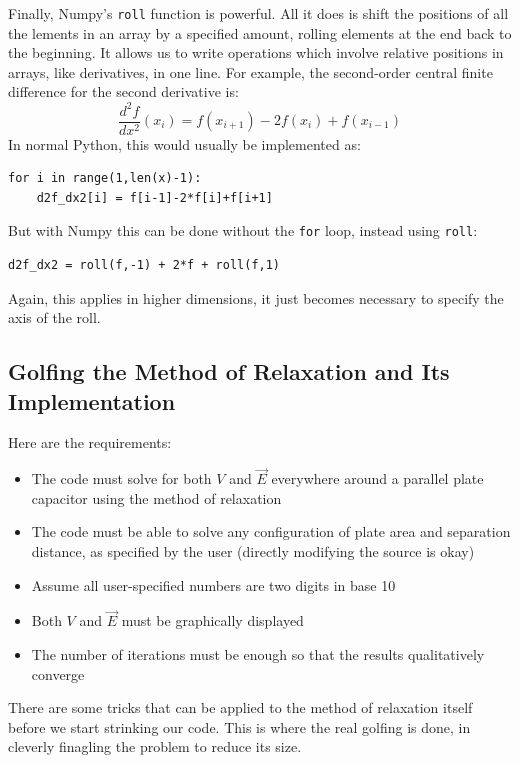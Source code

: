 \documentclass[12pt,twocolumn]{article}
\begin{document}
Finally, Numpy's \texttt{roll} function is powerful. All it does is shift the positions of all the lements in an array by a specified amount, rolling elements at the end back to the beginning. It allows us to write operations which involve relative positions in arrays, like derivatives, in one line. For example, the second-order central finite difference for the second derivative is:
\begin{equation}
\frac{d^2f}{dx^2}(x_i) = f(x_{i+1})-2 f(x_{i})+f(x_{i-1})
\end{equation}
In normal Python, this would usually be implemented as:
\begin{verbatim}
for i in range(1,len(x)-1):
    d2f_dx2[i] = f[i-1]-2*f[i]+f[i+1]
\end{verbatim}
But with Numpy this can be done without the \texttt{for} loop, instead using \texttt{roll}:
\begin{verbatim}
d2f_dx2 = roll(f,-1) + 2*f + roll(f,1)
\end{verbatim}
Again, this applies in higher dimensions, it just becomes necessary to specify the axis of the roll.

\subsection{Golfing the Method of Relaxation and Its Implementation}
Here are the requirements:
\begin{itemize}
    \item The code must solve for both $V$ and $\vec{E}$ everywhere around a parallel plate capacitor using the method of relaxation
    \item The code must be able to solve any configuration of plate area and separation distance, as specified by the user (directly modifying the source is okay)
    \item Assume all user-specified numbers are two digits in base 10
    \item Both $V$ and $\vec{E}$ must be graphically displayed
    \item The number of iterations must be enough so that the results qualitatively converge

\end{itemize}

There are some tricks that can be applied to the method of relaxation itself before we start strinking our code. This is where the real golfing is done, in cleverly finagling the problem to reduce its size.
\end{document}

